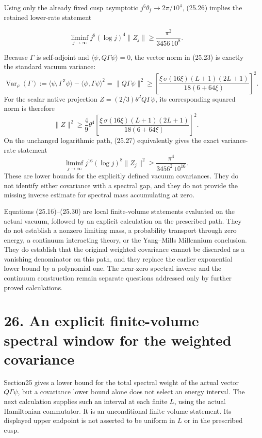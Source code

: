 \documentclass[
]{article}
\begin{document}
Using only the already fixed cusp asymptotic
\(j^6\theta_j\to2\pi/10^4\), (25.26) implies the retained lower-rate
statement

\[
\liminf_{j\to\infty}j^8(\log j)^4\|Z_j\|
 \ge\frac{\pi^2}{3456\,10^8}.
 \tag{25.27}
\]

Because \(\Gamma\) is self-adjoint and
\(\langle\psi,Q\Gamma\psi\rangle=0\), the vector norm in (25.23) is
exactly the standard vacuum variance: \[
 \operatorname{Var}_\rho(\Gamma)
 :=\langle\psi,\Gamma^2\psi\rangle
   -\langle\psi,\Gamma\psi\rangle^2
 =\|Q\Gamma\psi\|^2
 \ge
 \left[
 \frac{\xi\,\sigma(16\xi)(L+1)(2L+1)}
 {18(6+64\xi)}
 \right]^2 .
 \tag{25.28}
\] For the scalar native projection \(Z=(2/3)\theta^2Q\Gamma\psi\), its
corresponding squared norm is therefore \[
 \|Z\|^2
 \ge\frac49\theta^4
 \left[
 \frac{\xi\,\sigma(16\xi)(L+1)(2L+1)}
 {18(6+64\xi)}
 \right]^2 .
 \tag{25.29}
\] On the unchanged logarithmic path, (25.27) equivalently gives the
exact variance-rate statement \[
 \liminf_{j\to\infty}j^{16}(\log j)^8\|Z_j\|^2
 \ge\frac{\pi^4}{3456^2\,10^{16}} .
 \tag{25.30}
\] These are lower bounds for the explicitly defined vacuum covariances.
They do not identify either covariance with a spectral gap, and they do
not provide the missing inverse estimate for spectral mass accumulating
at zero.

Equations (25.16)--(25.30) are local finite-volume statements evaluated
on the actual vacuum, followed by an explicit calculation on the
prescribed path. They do not establish a nonzero limiting mass, a
probability transport through zero energy, a continuum interacting
theory, or the Yang--Mills Millennium conclusion. They do establish that
the original weighted covariance cannot be discarded as a vanishing
denominator on this path, and they replace the earlier exponential lower
bound by a polynomial one. The near-zero spectral inverse and the
continuum construction remain separate questions addressed only by
further proved calculations.

\section{26. An explicit finite-volume spectral window for the weighted
covariance}\label{an-explicit-finite-volume-spectral-window-for-the-weighted-covariance}

Section25 gives a lower bound for the total spectral weight of the
actual vector \(Q\Gamma\psi\), but a covariance lower bound alone does
not select an energy interval. The next calculation supplies such an
interval at each finite \(L\), using the actual Hamiltonian commutator.
It is an unconditional finite-volume statement. Its displayed upper
endpoint is not asserted to be uniform in \(L\) or in the prescribed
cusp.
\end{document}
